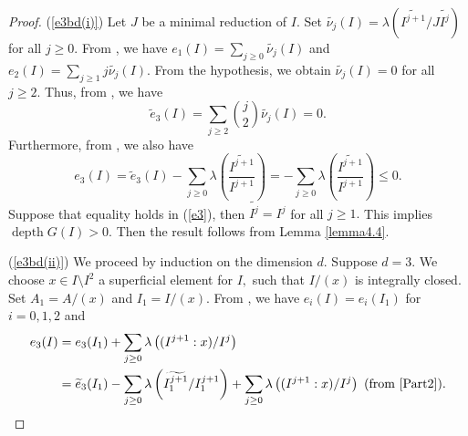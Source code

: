\documentclass[11pt]{amsart}
\theoremstyle{plain}
\newcommand{\wt}{\widetilde}
\newcommand{\depth}{\operatorname{depth}}
\theoremstyle{plain}
\begin{document}
\begin{proof} 


   (\ref{e3bd(i)}) Let $J$ be a minimal reduction of $I.$ Set $\wt{\nu_j}(I)=\lambda(\wt{I^{j+1}}/J\wt{I^j})$ for all $j\geq 0.$ From \cite[Equation 3.1]{rossi2010hilbert}, we have $e_1(I)=\sum_{j\geq 0}\wt{\nu_j}(I)$ and $e_2(I)=\sum_{j\geq 1}j\wt{\nu_j}(I).$ From the hypothesis, we obtain $\wt{\nu_j}(I)=0$ for all $j\geq 2.$ Thus, from \cite[Theorem 2.5$(c)$]{rossi2010hilbert}, we have
\begin{equation}\label{al}
    \wt{e}_{3}(I)=\displaystyle \sum _{j \geq 2}\binom{j}{2}\wt{\nu_j}(I)=0.
\end{equation}
 Furthermore, from \cite[1.5$(b)$]{Part2}, we also have
\begin{equation} \label{e3}
    e_{3}(I)=\wt{e}_{3}(I)-\sum_{j\geq 0}\lambda\left(\frac{\widetilde{I^{j+1}}}{I^{j+1}}\right)=-\sum_{j\geq 0}\lambda\left(\frac{\widetilde{I^{j+1}}}{I^{j+1}}\right)\leq 0.
\end{equation}
    Suppose that equality holds in (\ref{e3}), then $\widetilde{I^{j}}=I^{j}$ for all $j \geq 1.$ This implies $\depth G(I) >0.$ Then the result follows from Lemma \ref{lemma4.4}.


\noindent
(\ref{e3bd(ii)}) We proceed by induction on the dimension $d$. Suppose $d=3.$ We choose $x \in I\setminus I^2$ a superficial element for $I,$ such that $I/(x)$ is integrally closed. Set ${A_1}=A/(x)$ and ${I_1}=I/(x)$. From \cite[Proposition 1.2]{rossi2010hilbert}, we have $e_i(I)=e_i(I_1)$ for $i=0,1,2$ and
   \begin{align} \nonumber \label{123}
       e_{3}(I)&=e_{3}({I_1})+\sum_{j\geq 0}\lambda\left((I^{j+1}:x)/I^{j}\right)\\
       &=\widetilde{e}_{3}({I_1})-\sum_{j\geq 0}\lambda\left(\widetilde{{I^{j+1}_1}}/{I^{j+1}_1}\right)+\sum_{j\geq 0}\lambda\left((I^{j+1}:x)/I^{j}\right) \text{ (from \cite[1.5$(b)$]{Part2})}.
   \end{align}
    

\end{proof}
\end{document}
